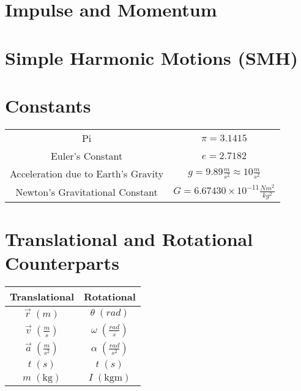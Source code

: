 \documentclass{article}
\newcommand{\unitP}[1]{\; (\mathrm{#1})}
\begin{document}
\newpage
\section{Impulse and Momentum}

\newpage
\section{Simple Harmonic Motions (SMH)}

\newpage
\appendix

\section{Constants}\label{Appendix A}

\begin{center}
\begin{tabular}{c | c}
    Pi & $\pi = 3.1415$\\
    Euler's Constant & $e = 2.7182$ \\
    Acceleration due to Earth's Gravity & $g = 9.89 \frac{m}{s^2} \approx 10 \frac{m}{s^2}$ \\
    Newton's Gravitational Constant & $G = 6.67430 \times 10^{-11} \frac{Nm^2}{kg^2}$ \\
\end{tabular}
\end{center}

\newpage
\section{Translational and Rotational Counterparts}\label{Appendix B}

\begin{center}
\begin{tabular}{|c | c |}
    \hline
    Translational & Rotational \\
    \hline \hline
    $\vec{r} \; (m)$ & $\theta \; (rad)$ \\
    $\vec{v} \; (\frac{m}{s}) $ & $\omega \; (\frac{rad}{s})$ \\
    $\vec{a} \; (\frac{m}{s^2})$ & $\alpha \; (\frac{rad}{s^2})$ \\
    $t \; (s)$ & $t \; (s)$ \\
    \hline \hline
    $m \; (\mathrm{kg})$ & $I \unitP{kgm}$\\
    \hline
\end{tabular}
\end{center}

\newpage
\end{document}
